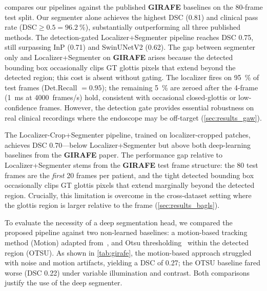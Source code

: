 \documentclass[preprint,12pt]{elsarticle}
\newcommand{\girafe}{\textbf{GIRAFE}}
\newcommand{\yolounet}{Localizer+Segmenter}
\newcommand{\yolocrop}{Localizer-Crop+Segmenter}
\begin{document}
 compares our pipelines against the published \girafe{}
baselines on the \num{80}-frame test split.
Our segmenter alone achieves the highest DSC (\num{0.81}) and clinical pass
rate (DSC${\geq}0.5 = \SI{96.2}{\%}$), substantially outperforming all
three published methods.
The detection-gated \yolounet{} pipeline reaches DSC \num{0.75},
still surpassing InP (\num{0.71}) and SwinUNetV2 (\num{0.62}).
The gap between segmenter only and \yolounet{} on \girafe{} arises because the
detected bounding box occasionally clips GT glottis pixels that extend beyond
the detected region; this cost is absent without gating.
The localizer fires on \SI{95}{\%} of test frames (Det.Recall $= 0.95$);
the remaining \SI{5}{\%} are zeroed after the 4-frame (\SI{1}{ms} at \SI{4000}{frames/s}) hold, consistent with
occasional closed-glottis or low-confidence frames.
However, the detection gate provides essential robustness on real clinical
recordings where the endoscope may be off-target (\cref{sec:results_gaw}).

The \yolocrop{} pipeline, trained on localizer-cropped patches, achieves DSC
\num{0.70}---below \yolounet{} but above both deep-learning baselines from
the \girafe{} paper.
The performance gap relative to \yolounet{} stems from the \girafe{} test
frame structure: the \num{80} test frames are the \emph{first} \num{20} frames
per patient, and the tight detected bounding box occasionally clips GT glottis
pixels that extend marginally beyond the detected region.
Crucially, this limitation is overcome in the cross-dataset setting where the
glottis region is larger relative to the frame (\cref{sec:results_bagls}).

To evaluate the necessity of a deep segmentation head, we compared the
proposed pipeline against two non-learned baselines: a motion-based
tracking method (Motion) adapted from~\cite{patel2015kinematic}, and
Otsu thresholding~\cite{otsu1979threshold} within the detected region (OTSU).
As shown in \cref{tab:girafe}, the motion-based approach struggled with
noise and motion artifacts, yielding a DSC of \num{0.27}; the OTSU baseline
fared worse (DSC \num{0.22}) under variable illumination and contrast.
Both comparisons justify the use of the deep segmenter.
\end{document}
